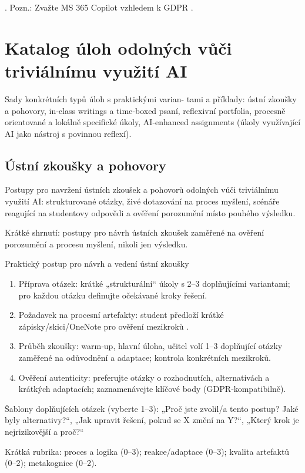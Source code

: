 \documentclass{report}%
\begin{document}
. Pozn.: Zvažte MS 365 Copilot vzhledem k GDPR \cite{kb_ai_101_tipu_pdf_04e4a115_page_3_1}.%

%
\section{Katalog úloh odolných vůči triviálnímu využití AI}%
Sady konkrétních typů úloh s praktickými varian- tami a příklady: ústní zkoušky a pohovory, in‑class writings a time‑boxed psaní, reflexivní portfolia, procesně orientované a lokálně specifické úkoly, AI‑enhanced assignments (úkoly využívající AI jako nástroj s povinnou reflexí).%
\subsection{Ústní zkoušky a pohovory}%
Postupy pro navržení ústních zkoušek a pohovorů odolných vůči triviálnímu využití AI: strukturované otázky, živé dotazování na proces myšlení, scénáře reagující na studentovy odpovědi a ověření porozumění místo pouhého výsledku.%


%
Krátké shrnutí: postupy pro návrh ústních zkoušek zaměřené na ověření porozumění a procesu myšlení, nikoli jen výsledku.

Praktický postup pro návrh a vedení ústní zkoušky
\begin{enumerate}
  \item Příprava otázek: krátké „strukturální“ úkoly s 2–3 doplňujícími variantami; pro každou otázku definujte očekávané kroky řešení.
  \item Požadavek na procesní artefakty: student předloží krátké zápisky/skici/OneNote pro ověření mezikroků \cite{kb_ai_101_tipu_pdf_04e4a115_page_8_1}.
  \item Průběh zkoušky: warm‑up, hlavní úloha, učitel volí 1–3 doplňující otázky zaměřené na odůvodnění a adaptace; kontrola konkrétních mezikroků.
  \item Ověření autenticity: preferujte otázky o rozhodnutích, alternativách a krátkých adaptacích; zaznamenávejte klíčové body (GDPR‑kompatibilně).
\end{enumerate}

Šablony doplňujících otázek (vyberte 1–3): „Proč jste zvolil/a tento postup? Jaké byly alternativy?“, „Jak upravit řešení, pokud se X změní na Y?“, „Který krok je nejrizikovější a proč?“

Krátká rubrika: proces a logika (0–3); reakce/adaptace (0–3); kvalita artefaktů (0–2); metakognice (0–2).
\end{document}
